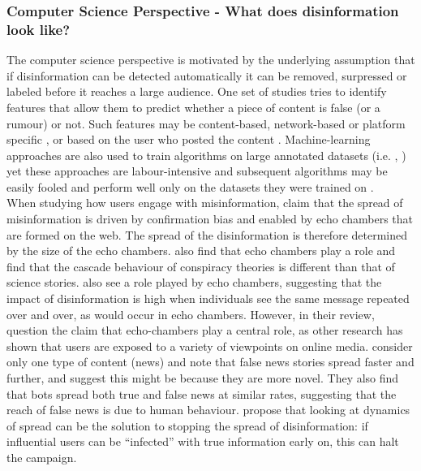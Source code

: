 \subsubsection{Computer Science Perspective - What does disinformation look like?}
The computer science perspective is motivated by the underlying assumption that if disinformation can be detected automatically it can be removed, surpressed or labeled before it reaches a large audience. One set of studies tries to identify features that allow them to predict whether a piece of content is false (or a rumour) or not. Such features may be content-based, network-based or platform specific  \citep{qazvinian2011rumor}, or based on the user who posted the content \citep{liu2015real}. Machine-learning approaches are also used to train algorithms on large annotated datasets (i.e. \cite{wang2017liar}, \cite{mitra2015credbank} \cite{papadopoulou2019corpus}) yet these approaches are labour-intensive and subsequent algorithms may be easily fooled and perform well only on the datasets they were trained on \citep{grondahl2018all}. \\

When studying how users engage with misinformation, \cite{Zollo2018} claim that the spread of misinformation is driven by confirmation bias and enabled by echo chambers that are formed on the web. The spread of the disinformation is therefore determined by the size of the echo chambers. \cite{DelVicario2016} also find that echo chambers play a role and find that the cascade behaviour of conspiracy theories is different than that of science stories.  \cite{Kumar2018} also see a role played by echo chambers, suggesting that the impact of disinformation is high when individuals see the same message repeated over and over, as would occur in echo chambers. However, in their review, \cite{Tucker2018} question the claim that echo-chambers play a central role, as other research has shown that users are exposed to a variety of viewpoints on online media. \cite{Vosoughi2018} consider only one type of content (news) and note that false news stories spread faster and further, and suggest this might be because they are more novel. They also find that bots spread both true and false news at similar rates, suggesting that the reach of false news is due to human behaviour. \cite{Budak2011} propose that looking at dynamics of spread can be the solution to stopping the spread of disinformation: if influential users can be “infected” with true information early on, this can halt the campaign. \\



